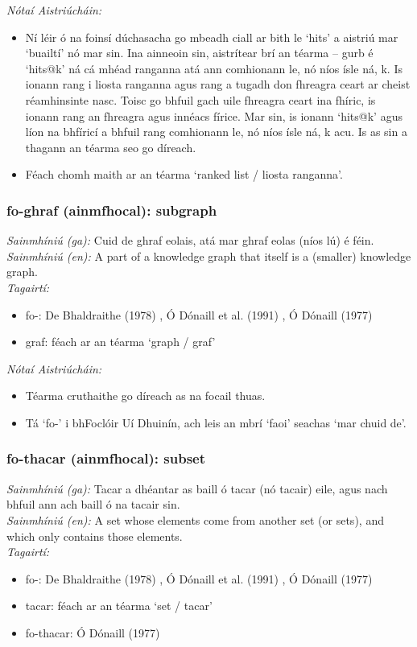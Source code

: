  \noindent \textit{Nótaí Aistriúcháin:}
\begin{itemize}
	\item Ní léir ó na foinsí dúchasacha go mbeadh ciall ar bith le `hits' a aistriú mar `buailtí' nó mar sin. Ina ainneoin sin, aistrítear brí an téarma -- gurb é `hits@k' ná cá mhéad ranganna atá ann comhionann le, nó níos ísle ná, k. Is ionann rang i liosta ranganna agus rang a tugadh don fhreagra ceart ar cheist réamhinsinte nasc. Toisc go bhfuil gach uile fhreagra ceart ina fhíric, is ionann rang an fhreagra agus innéacs fírice. Mar sin, is ionann `hits@k' agus líon na bhfíricí a bhfuil rang comhionann le, nó níos ísle ná, k acu. Is as sin a thagann an téarma seo go díreach.
	\item Féach chomh maith ar an téarma `ranked list / liosta ranganna'.
\end{itemize}


\subsubsection*{fo-ghraf (ainmfhocal): subgraph}
 \noindent \textit{Sainmhíniú (ga):} Cuid de ghraf eolais, atá mar ghraf eolas (níos lú) é féin.
\\
 \noindent \textit{Sainmhíniú (en):} A part of a knowledge graph that itself is a (smaller) knowledge graph.
\\
 \noindent \textit{Tagairtí:}
\begin{itemize}
	\item fo-: De Bhaldraithe (1978) \cite{de-bhaldraithe}, Ó Dónaill et al. (1991) \cite{focloir-beag}, Ó Dónaill (1977) \cite{odonaill}
	\item graf: féach ar an téarma `graph / graf'
\end{itemize}

 \noindent \textit{Nótaí Aistriúcháin:}
\begin{itemize}
	\item Téarma cruthaithe go díreach as na focail thuas.
	\item Tá `fo-' i bhFoclóir Uí Dhuinín, ach leis an mbrí `faoi' seachas `mar chuid de'.
\end{itemize}


\subsubsection*{fo-thacar (ainmfhocal): subset}
 \noindent \textit{Sainmhíniú (ga):} Tacar a dhéantar as baill ó tacar (nó tacair) eile, agus nach bhfuil ann ach baill ó na tacair sin.
\\
 \noindent \textit{Sainmhíniú (en):} A set whose elements come from another set (or sets), and which only contains those elements.
\\
 \noindent \textit{Tagairtí:}
\begin{itemize}
	\item fo-: De Bhaldraithe (1978) \cite{de-bhaldraithe}, Ó Dónaill et al. (1991) \cite{focloir-beag}, Ó Dónaill (1977) \cite{odonaill}
	\item tacar: féach ar an téarma `set / tacar'
	\item fo-thacar: Ó Dónaill (1977) \cite{odonaill}
\end{itemize}

